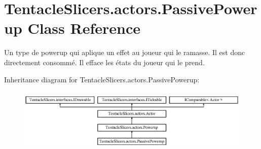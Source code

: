 \hypertarget{class_tentacle_slicers_1_1actors_1_1_passive_powerup}{}\section{Tentacle\+Slicers.\+actors.\+Passive\+Powerup Class Reference}
\label{class_tentacle_slicers_1_1actors_1_1_passive_powerup}


Un type de powerup qui aplique un effet au joueur qui le ramasse. Il est donc directement consommé. Il efface les états du joueur qui le prend.  


Inheritance diagram for Tentacle\+Slicers.\+actors.\+Passive\+Powerup\+:\begin{figure}[H]
\begin{center}
\leavevmode
\includegraphics[height=3.060109cm]{class_tentacle_slicers_1_1actors_1_1_passive_powerup}
\end{center}
\end{figure}
